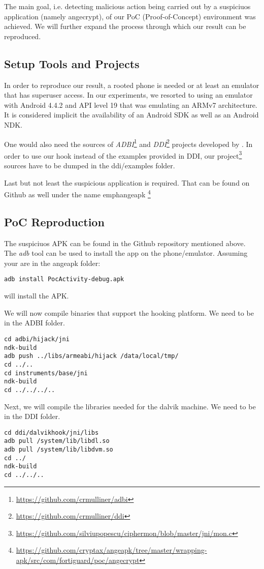 The main goal, i.e. detecting malicious action being carried out by 
a suspiciuos application (namely angecrypt), of our PoC (Proof-of-Concept)
environment was achieved. We will further expand the process through
 which our result can be reproduced.

\subsection{Setup Tools and Projects}
In order to reproduce our result, a rooted phone is needed or at least an 
emulator that has superuser access. In our experiments, we resorted to 
using an emulator with Android 4.4.2 and API level 19 that was emulating 
an ARMv7 architecture. It is considered implicit the availability of an 
Android SDK as well as an Android NDK.

One would also need the sources of \emph{ADBI}\footnote{\url{https://github.com/crmulliner/adbi}}
and \emph{DDI}\footnote{\url{https://github.com/crmulliner/ddi}} 
projects developed by \cite{ddi}. In order to use our hook instead of the 
examples provided in DDI, our project\footnote{\url{https://github.com/silviupopescu/ciphermon/blob/master/jni/mon.c}} sources have to be dumped in the ddi/examples folder.

Last but not least the suspicious application is required. That can be 
found on Github as well under the name emph{angeapk}
\footnote{\url{https://github.com/cryptax/angeapk/tree/master/wrapping-apk/src/com/fortiguard/poc/angecrypt}}

\subsection{PoC Reproduction}

The suspiciuos APK can be found in the Github repository mentioned above. 
The \emph{adb} tool can be used to install the app on the phone/emulator.
Assuming your are in the angeapk folder:
\begin{verbatim}
adb install PocActivity-debug.apk
\end{verbatim}
will install the APK.

We will now compile binaries that support the hooking platform. We 
need to be in the ADBI folder.
\begin{verbatim}
cd adbi/hijack/jni
ndk-build
adb push ../libs/armeabi/hijack /data/local/tmp/
cd ../..
cd instruments/base/jni
ndk-build
cd ../../../..
\end{verbatim}
Next, we will compile the libraries needed for the dalvik machine. We 
need to be in the DDI folder.
\begin{verbatim}
cd ddi/dalvikhook/jni/libs
adb pull /system/lib/libdl.so
adb pull /system/lib/libdvm.so
cd ../
ndk-build
cd ../../..
\end{verbatim}


